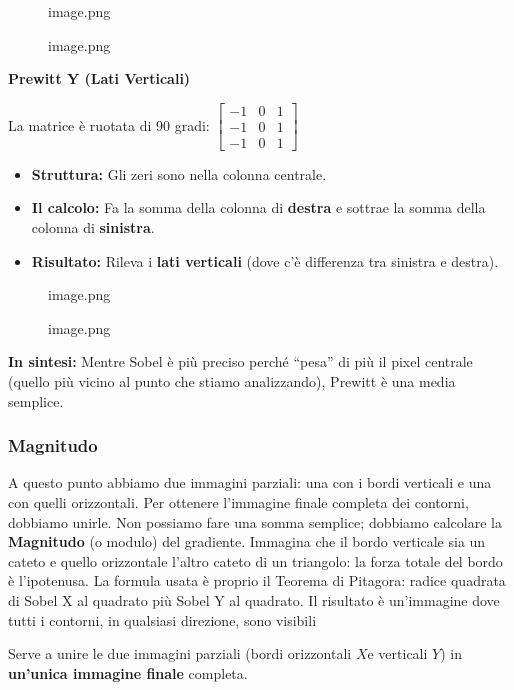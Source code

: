 \documentclass[
]{article}
\providecommand{\tightlist}{%
  \setlength{\itemsep}{0pt}\setlength{\parskip}{0pt}}
\begin{document}
\begin{figure}
\centering
{image.png}
\caption{image.png}
\end{figure}

\textbf{Prewitt Y (Lati Verticali)}

La matrice è ruotata di 90 gradi: \(\begin{bmatrix} -1 & 0 & 1 \\ -1 & 0 & 1 \\ -1 & 0 & 1 \end{bmatrix}\)

\begin{itemize}
\tightlist
\item
  \textbf{Struttura:} Gli zeri sono nella colonna centrale.
\item
  \textbf{Il calcolo:} Fa la somma della colonna di \textbf{destra} e sottrae la somma della colonna di \textbf{sinistra}.
\item
  \textbf{Risultato:} Rileva i \textbf{lati verticali} (dove c'è differenza tra sinistra e destra).
\end{itemize}

\begin{figure}
\centering
{image.png}
\caption{image.png}
\end{figure}

\textbf{In sintesi:} Mentre Sobel è più preciso perché ``pesa'' di più il pixel centrale (quello più vicino al punto che stiamo analizzando), Prewitt è una media semplice.

\hypertarget{magnitudo}{%
\subsubsection{Magnitudo}\label{magnitudo}}

A questo punto abbiamo due immagini parziali: una con i bordi verticali e una con quelli orizzontali. Per ottenere l'immagine finale completa dei contorni, dobbiamo unirle. Non possiamo fare una somma semplice; dobbiamo calcolare la \textbf{Magnitudo} (o modulo) del gradiente. Immagina che il bordo verticale sia un cateto e quello orizzontale l'altro cateto di un triangolo: la forza totale del bordo è l'ipotenusa. La formula usata è proprio il Teorema di Pitagora: radice quadrata di Sobel X al quadrato più Sobel Y al quadrato. Il risultato è un'immagine dove tutti i contorni, in qualsiasi direzione, sono visibili

Serve a unire le due immagini parziali (bordi orizzontali \(X\)e verticali \(Y\)) in \textbf{un'unica immagine finale} completa.
\end{document}
